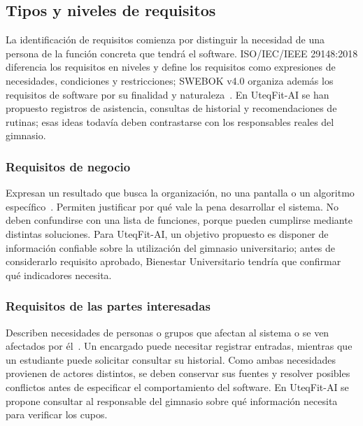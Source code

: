 \subsection{Tipos y niveles de requisitos}
\label{sec:tipos-requisitos}

La identificación de requisitos comienza por distinguir la necesidad de una persona de la función concreta que tendrá el software. ISO/IEC/IEEE 29148:2018 diferencia los requisitos en niveles y define los requisitos como expresiones de necesidades, condiciones y restricciones; SWEBOK v4.0 organiza además los requisitos de software por su finalidad y naturaleza~\cite{ieee29148,swebok2024}. En UteqFit-AI se han propuesto registros de asistencia, consultas de historial y recomendaciones de rutinas; esas ideas todavía deben contrastarse con los responsables reales del gimnasio.

\subsubsection{Requisitos de negocio}
Expresan un resultado que busca la organización, no una pantalla o un algoritmo específico~\cite{ieee29148}. Permiten justificar por qué vale la pena desarrollar el sistema. No deben confundirse con una lista de funciones, porque pueden cumplirse mediante distintas soluciones. Para UteqFit-AI, un objetivo propuesto es disponer de información confiable sobre la utilización del gimnasio universitario; antes de considerarlo requisito aprobado, Bienestar Universitario tendría que confirmar qué indicadores necesita.

\subsubsection{Requisitos de las partes interesadas}
Describen necesidades de personas o grupos que afectan al sistema o se ven afectados por él~\cite{ieee29148}. Un encargado puede necesitar registrar entradas, mientras que un estudiante puede solicitar consultar su historial. Como ambas necesidades provienen de actores distintos, se deben conservar sus fuentes y resolver posibles conflictos antes de especificar el comportamiento del software. En UteqFit-AI se propone consultar al responsable del gimnasio sobre qué información necesita para verificar los cupos.

